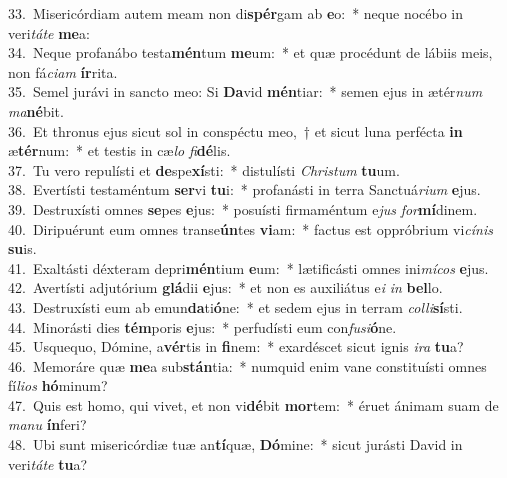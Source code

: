 {33.~}Misericórdiam autem meam non di\textbf{spér}gam ab \textbf{e}o:~* neque nocébo in veri\textit{tá}\textit{te} \textbf{me}a:\\
{34.~}Neque profanábo testa\textbf{mén}tum \textbf{me}um:~* et quæ procédunt de lábiis meis, non fá\textit{ci}\textit{am} \textbf{ír}rita.\\
{35.~}Semel jurávi in sancto meo: Si \textbf{Da}vid \textbf{mén}tiar:~* semen ejus in ætér\textit{num} \textit{ma}\textbf{né}bit.\\
{36.~}Et thronus ejus sicut sol in conspéctu meo,~† et sicut luna perfécta \textbf{in} æ\textbf{tér}num:~* et testis in cæ\textit{lo} \textit{fi}\textbf{dé}lis.\\
{37.~}Tu vero repulísti et \textbf{de}spe\textbf{xí}sti:~* distulísti \textit{Chri}\textit{stum} \textbf{tu}um.\\
{38.~}Evertísti testaméntum \textbf{ser}vi \textbf{tu}i:~* profanásti in terra Sanctuá\textit{ri}\textit{um} \textbf{e}jus.\\
{39.~}Destruxísti omnes \textbf{se}pes \textbf{e}jus:~* posuísti firmaméntum e\textit{jus} \textit{for}\textbf{mí}dinem.\\
{40.~}Diripuérunt eum omnes transe\textbf{ún}tes \textbf{vi}am:~* factus est oppróbrium vi\textit{cí}\textit{nis} \textbf{su}is.\\
{41.~}Exaltásti déxteram depri\textbf{mén}tium \textbf{e}um:~* lætificásti omnes ini\textit{mí}\textit{cos} \textbf{e}jus.\\
{42.~}Avertísti adjutórium \textbf{glá}dii \textbf{e}jus:~* et non es auxiliátus e\textit{i} \textit{in} \textbf{bel}lo.\\
{43.~}Destruxísti eum ab emun\textbf{da}ti\textbf{ó}ne:~* et sedem ejus in terram \textit{col}\textit{li}\textbf{sí}sti.\\
{44.~}Minorásti dies \textbf{tém}poris \textbf{e}jus:~* perfudísti eum con\textit{fu}\textit{si}\textbf{ó}ne.\\
{45.~}Usquequo, Dómine, a\textbf{vér}tis in \textbf{fi}nem:~* exardéscet sicut ignis \textit{i}\textit{ra} \textbf{tu}a?\\
{46.~}Memoráre quæ \textbf{me}a sub\textbf{stán}tia:~* numquid enim vane constituísti omnes fí\textit{li}\textit{os} \textbf{hó}minum?\\
{47.~}Quis est homo, qui vivet, et non vi\textbf{dé}bit \textbf{mor}tem:~* éruet ánimam suam de \textit{ma}\textit{nu} \textbf{ín}feri?\\
{48.~}Ubi sunt misericórdiæ tuæ an\textbf{tí}quæ, \textbf{Dó}mine:~* sicut jurásti David in veri\textit{tá}\textit{te} \textbf{tu}a?\\

